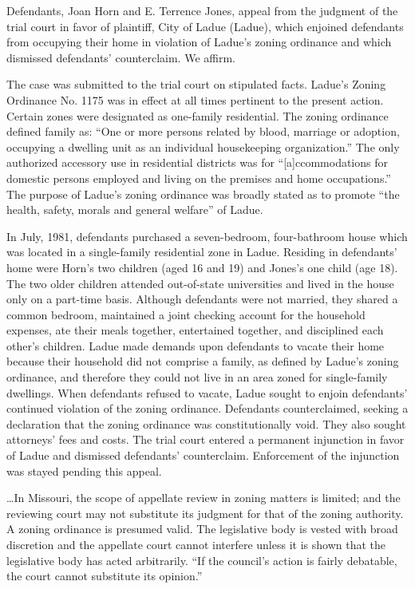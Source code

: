 

Defendants, Joan Horn and E. Terrence Jones, appeal from the judgment of the
trial court in favor of plaintiff, City of Ladue (Ladue), which enjoined
defendants from occupying their home in violation of Ladue's zoning ordinance
and which dismissed defendants' counterclaim. We affirm.

The case was submitted to the trial court on stipulated facts. Ladue's Zoning
Ordinance No. 1175 was in effect at all times pertinent to the present action.
Certain zones were designated as one-family residential. The zoning ordinance
defined family as: ``One or more persons related by blood, marriage or adoption,
occupying a dwelling unit as an individual housekeeping organization.'' The only
authorized accessory use in residential districts was for ``[a]ccommodations for
domestic persons employed and living on the premises and home occupations.'' The
purpose of Ladue's zoning ordinance was broadly stated as to promote ``the
health, safety, morals and general welfare'' of Ladue.

In July, 1981, defendants purchased a seven-bedroom, four-bathroom house which
was located in a single-family residential zone in Ladue. Residing in
defendants' home were Horn's two children (aged 16 and 19) and Jones's one child
(age 18). The two older children attended out-of-state universities and lived in
the house only on a part-time basis. Although defendants were not married, they
shared a common bedroom, maintained a joint checking account for the household
expenses, ate their meals together, entertained together, and disciplined each
other's children. Ladue made demands upon defendants to vacate their home
because their household did not comprise a family, as defined by Ladue's zoning
ordinance, and therefore they could not live in an area zoned for single-family
dwellings. When defendants refused to vacate, Ladue sought to enjoin defendants'
continued violation of the zoning ordinance. Defendants counterclaimed, seeking
a declaration that the zoning ordinance was constitutionally void. They also
sought attorneys' fees and costs. The trial court entered a permanent injunction
in favor of Ladue and dismissed defendants' counterclaim. Enforcement of the
injunction was stayed pending this appeal.

\ldots In Missouri, the scope of appellate review in zoning matters is limited;
and the reviewing court may not substitute its judgment for that of the zoning
authority. A zoning ordinance is presumed valid. The legislative body is vested
with broad discretion and the appellate court cannot interfere unless it is
shown that the legislative body has acted arbitrarily. ``If the council's action
is fairly debatable, the court cannot substitute its opinion.'' 

